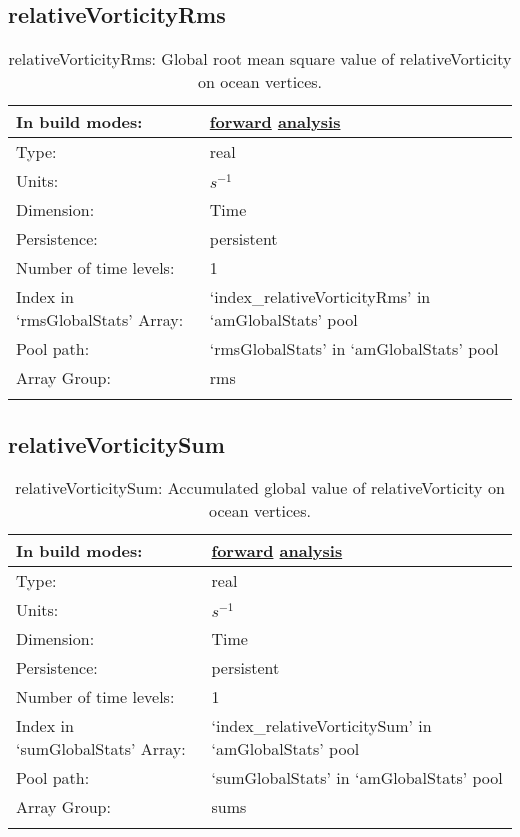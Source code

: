 \subsection[relativeVorticityRms]{relativeVorticityRms}
\label{subsec:var_sec_amGlobalStats_relativeVorticityRms}
\begin{center}
\begin{longtable}{| p{2.0in} | p{4.0in} |}
        \hline 
        In build modes: & \hyperref[subsec:forward_var_tab_amGlobalStats]{forward} \hyperref[subsec:analysis_var_tab_amGlobalStats]{analysis} \\
        \hline 
        Type: & real \\
        \hline 
        Units: & $s^{-1}$ \\
        \hline 
        Dimension: & Time \\
        \hline 
        Persistence: & persistent \\
        \hline 
        Number of time levels: & 1 \\
        \hline 
		 Index in `rmsGlobalStats' Array: & `index\_relativeVorticityRms' in `amGlobalStats' pool \\
		 \hline 
            Pool path: & `rmsGlobalStats' in `amGlobalStats' pool \\
		 \hline 
		 Array Group: & rms \\
		 \hline 
    \caption{relativeVorticityRms: Global root mean square value of relativeVorticity on ocean vertices.}
\end{longtable}
\end{center}
\subsection[relativeVorticitySum]{relativeVorticitySum}
\label{subsec:var_sec_amGlobalStats_relativeVorticitySum}
\begin{center}
\begin{longtable}{| p{2.0in} | p{4.0in} |}
        \hline 
        In build modes: & \hyperref[subsec:forward_var_tab_amGlobalStats]{forward} \hyperref[subsec:analysis_var_tab_amGlobalStats]{analysis} \\
        \hline 
        Type: & real \\
        \hline 
        Units: & $s^{-1}$ \\
        \hline 
        Dimension: & Time \\
        \hline 
        Persistence: & persistent \\
        \hline 
        Number of time levels: & 1 \\
        \hline 
		 Index in `sumGlobalStats' Array: & `index\_relativeVorticitySum' in `amGlobalStats' pool \\
		 \hline 
            Pool path: & `sumGlobalStats' in `amGlobalStats' pool \\
		 \hline 
		 Array Group: & sums \\
		 \hline 
    \caption{relativeVorticitySum: Accumulated global value of relativeVorticity on ocean vertices.}
\end{longtable}
\end{center}
